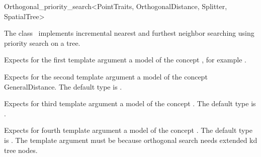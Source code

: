 

\begin{ccRefClass}{Orthogonal_priority_search<PointTraits, OrthogonalDistance, Splitter, SpatialTree>}


\ccDefinition

The class \ccRefName\ implements incremental nearest and furthest neighbor searching
using priority search on a tree.


\ccParameters

Expects for the first template argument a model of the concept ,
for example .

Expects for the second template argument a model of the
concept GeneralDistance. The default type is 
.

Expects for third template argument a model of the concept .
The default type is .

Expects for fourth template argument a model of the concept .
The default type is . The 
template argument must be  because orthogonal search needs extended 
kd tree nodes.

\ccTypes


\ccCreation
{}  %


\end{ccRefClass}
